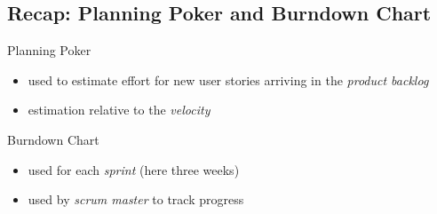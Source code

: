 \subsection{Recap: Planning Poker and Burndown Chart}
\begin{frame}{\insertsubsection}
	\begin{fancycolumns}[widths={35}]
		\begin{note}{Planning Poker}
			\begin{itemize}
				\item used to estimate effort for new user stories arriving in the \emph{product backlog}
				\item estimation relative to the \emph{velocity}
			\end{itemize}
		\end{note}
	\nextcolumn
		\begin{note}{Burndown Chart}
			\begin{itemize}
				\item used for each \emph{sprint} (here three weeks)
				\item used by \emph{scrum master} to track progress
			\end{itemize}
		\end{note}
	\end{fancycolumns}
\end{frame}



